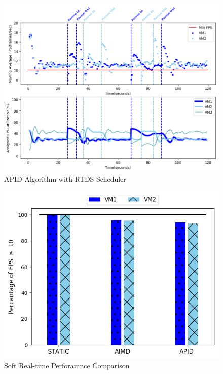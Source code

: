 \begin{itemize}
\begin{figure}[h!]
\centering
\includegraphics[width=1\linewidth]{images/3vm_apid}
\caption{APID Algorithm with RTDS Scheduler}
\label{3vm_apid}
\end{figure}


\begin{figure}[h!]
\centering
\includegraphics[width=1\linewidth]{images/3vm_fps}
\caption{Soft Real-time Perforamnce Comparison}
\label{3vm_fps}
\end{figure}



\end{itemize}
